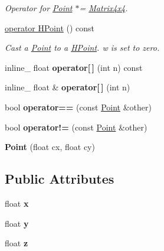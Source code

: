 \begin{DoxyCompactItemize}
\begin{DoxyCompactList}\small\item\em Operator for \hyperlink{classPoint}{Point} $\ast$= \hyperlink{classMatrix4x4}{Matrix4x4}. \end{DoxyCompactList}\item 
\hyperlink{classPoint_a9210b0ae57c30d2ac536491469437a1a}{operator H\+Point} () const \hypertarget{classPoint_a9210b0ae57c30d2ac536491469437a1a}{}\label{classPoint_a9210b0ae57c30d2ac536491469437a1a}

\begin{DoxyCompactList}\small\item\em Cast a \hyperlink{classPoint}{Point} to a \hyperlink{classHPoint}{H\+Point}. w is set to zero. \end{DoxyCompactList}\item 
inline\+\_\+ float {\bfseries operator\mbox{[}$\,$\mbox{]}} (int n) const \hypertarget{classPoint_ace7331f59fa157dab844a0e00c14b3a9}{}\label{classPoint_ace7331f59fa157dab844a0e00c14b3a9}

\item 
inline\+\_\+ float \& {\bfseries operator\mbox{[}$\,$\mbox{]}} (int n)\hypertarget{classPoint_a130f0bad1cb2de935f85ed5874584a20}{}\label{classPoint_a130f0bad1cb2de935f85ed5874584a20}

\item 
bool {\bfseries operator==} (const \hyperlink{classPoint}{Point} \&other)\hypertarget{classPoint_af1930c3580530ecd95d0ef38da0e74ff}{}\label{classPoint_af1930c3580530ecd95d0ef38da0e74ff}

\item 
bool {\bfseries operator!=} (const \hyperlink{classPoint}{Point} \&other)\hypertarget{classPoint_a28e63b869129d0731a75080bf7005597}{}\label{classPoint_a28e63b869129d0731a75080bf7005597}

\item 
{\bfseries Point} (float cx, float cy)\hypertarget{classPoint_afa8ad07f2f7c6b5d43bc2fd2f772b4dc}{}\label{classPoint_afa8ad07f2f7c6b5d43bc2fd2f772b4dc}

\end{DoxyCompactItemize}
\subsection*{Public Attributes}
\begin{DoxyCompactItemize}
\item 
float {\bfseries x}\hypertarget{classPoint_a05dfe2dfbde813ad234b514f30e662f1}{}\label{classPoint_a05dfe2dfbde813ad234b514f30e662f1}

\item 
float {\bfseries y}\hypertarget{classPoint_a6101960c8d2d4e8ea1d32c9234bbeb8d}{}\label{classPoint_a6101960c8d2d4e8ea1d32c9234bbeb8d}

\item 
float {\bfseries z}\hypertarget{classPoint_a9a666531e0e99adff132be93d2407d0c}{}\label{classPoint_a9a666531e0e99adff132be93d2407d0c}

\end{DoxyCompactItemize}
